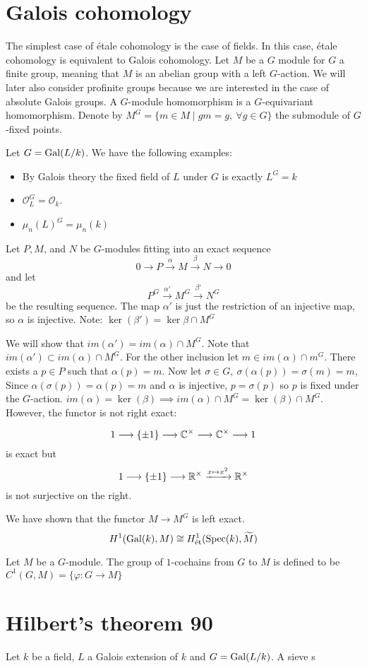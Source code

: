 \section{Galois cohomology}
The simplest case of \'etale cohomology is the case of fields. In this case, \'etale cohomology is equivalent to Galois cohomology.
Let $M$ be a $G$ module for $G$ a finite group, meaning that $M$ is an abelian group with a left $G$-action. We will later also consider profinite groups because we are interested in the case of absolute Galois groups. A $G$-module homomorphism is a $G$-equivariant homomorphism. Denote by $M^G = \{m \in M \mid gm = g, \ \forall g \in G\}$ the submodule of $G$-fixed points.
\begin{example}
	Let $G = \operatorname{Gal}(L/k)$. We have the following examples:
	\begin{itemize}
		\item By Galois theory the fixed field of $L$ under $G$ is exactly $L^G = k$
		\item $\mathcal{O}_L^G = \mathcal{O}_k$.
		\item $\mu_n(L)^G = \mu_n(k)$
	\end{itemize}
\end{example}

Let $P, M$, and $N$ be $G$-modules fitting into an exact sequence
\[
	0 \to P \xrightarrow{\alpha} M \xrightarrow{\beta} N \to 0
\]
and let
\[
	P^G \xrightarrow{\alpha'} M^G \xrightarrow{\beta'} N^G
\]
be the resulting sequence. The map $\alpha'$ is just the restriction of an injective map, so $\alpha$ is injective.
Note:
$\ker(\beta') = \ker \beta \cap M^G$

We will show that $im(\alpha') = im(\alpha) \cap M^G$.
Note that $im(\alpha') \subset im(\alpha) \cap M^G$.
For the other inclusion let $m \in im(\alpha) \cap m^G$. There exists a $p \in P$ such that $\alpha(p)=m$. Now let $\sigma \in G,\ \sigma(\alpha(p)) = \sigma(m) = m$,
Since $\alpha(\sigma(p)) = \alpha(p) = m$ and $\alpha$ is injective, $p = \sigma(p)$ so $p$ is fixed under the $G$-action. $im(\alpha) = \ker(\beta) \implies im(\alpha) \cap M^G = \ker(\beta) \cap M^G$.
However, the functor is not right exact:
\begin{example}
	\[1 \longrightarrow \{\pm 1\} \longrightarrow \mathbb{C}^\times \longrightarrow \mathbb{C}^\times \longrightarrow 1\]
	is exact but
	\[1 \longrightarrow\{\pm 1\} \longrightarrow \mathbb{R}^\times \xrightarrow{x \mapsto x^2} \mathbb{R}^\times\]
	is not surjective on the right.
\end{example}

We have shown that the functor $M \to M^G$ is left exact.
\[H^1(\operatorname{Gal}(k),M) \cong H_\text{\text{\'et}}^1(\operatorname{Spec}(k), \widetilde{M})\]

\begin{definition}
	Let $M$ be a $G$-module. The group of $1$-cochains from $G$ to $M$ is defined to be  $C^1(G, M) = \{\varphi: G \to M\}$
\end{definition}

\section{Hilbert's theorem 90}
Let $k$ be a field, $L$ a Galois extension of $k$ and $G = \operatorname{Gal}(L/k)$. A sieve s
